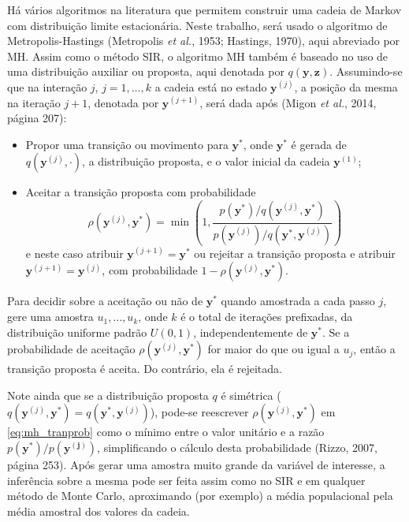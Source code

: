 Há vários algoritmos na literatura que permitem construir uma cadeia de Markov com distribuição limite estacionária. Neste trabalho, será usado o algoritmo de Metropolis-Hastings (Metropolis \textit{et al.}, 1953\cite{Metrop1953}; Hastings, 1970\cite{Hastin1970}), aqui abreviado por MH. Assim como o método SIR, o algoritmo MH também é baseado no uso de uma distribuição auxiliar ou proposta, aqui denotada por $q(\bm{y}, \bm{z})$. Assumindo-se que na interação $j$, $j = 1, \ldots, k$ a cadeia está no estado $\bm{y}^{(j)}$, a posição da mesma na iteração $j + 1$, denotada por $\bm{y}^{(j + 1)}$, será dada após (Migon \textit{et al.}, 2014, página 207)\cite{MiGaLou2014}:
\begin{itemize}
	\item Propor uma transição ou movimento para $\bm{y}^*$, onde $\bm{y}^*$ é gerada de $q(\bm{y}^{(j)}, \cdot)$, a distribuição proposta, e o valor inicial da cadeia $\mathbf{y}^{(1)}$;
	\item Aceitar a transição proposta com probabilidade
	\begin{equation}\label{eq:mh_tranprob}
	\rho(\bm{y}^{(j)}, \bm{y}^*) = \min\left(1, \dfrac{p(\bm{y}^*) / q(\bm{y}^{(j)}, \bm{y}^*)}{p(\bm{y}^{(j)}) / q(\bm{y}^*, \bm{y}^{(j)})}\right)
	\end{equation}
	e neste caso atribuir $\bm{y}^{(j + 1)} = \bm{y}^*$ ou rejeitar a transição proposta e atribuir $\bm{y}^{(j + 1)} = \bm{y}^{(j)}$, com probabilidade $1 - \rho(\bm{y}^{(j)}, \bm{y}^*)$.
\end{itemize}

Para decidir sobre a aceitação ou não de $\bm{y}^*$ quando amostrada a cada passo $j$, gere uma amostra $u_1, \ldots, u_k$, onde $k$ é o total de iterações prefixadas, da distribuição uniforme padrão $U(0,1)$, independentemente de $\bm{y}^*$. Se a probabilidade de aceitação $\rho(\bm{y}^{(j)}, \bm{y}^*)$ for maior do que ou igual a $u_j$, então a transição proposta é aceita. Do contrário, ela é rejeitada.

Note ainda que se a distribuição proposta $q$ é simétrica ($q(\bm{y}^{(j)}, \bm{y}^*) =  q(\bm{y}^*, \bm{y}^{(j)})$), pode-se reescrever $\rho(\bm{y}^{(j)}, \bm{y}^*)$ em \eqref{eq:mh_tranprob} como o mínimo entre o valor unitário e a razão $p(\bm{y}^*)/p(\bm{y^{(j)}})$, simplificando o cálculo desta probabilidade (Rizzo, 2007, página 253)\cite{Rizzo2007}. Após gerar uma amostra muito grande da variável de interesse, a inferência sobre a mesma pode ser feita assim como no SIR e em qualquer método de Monte Carlo, aproximando (por exemplo) a média populacional pela média amostral dos valores da cadeia.

